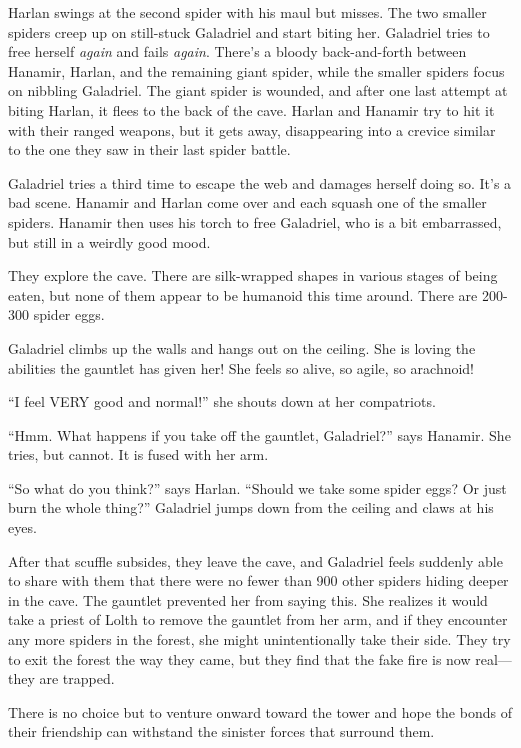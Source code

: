 \documentclass[smalldemyvopaper,11pt,twoside,onecolumn,openright,extrafontsizes]{memoir}
\begin{document}
Harlan swings at the second spider with his maul but misses. The two
smaller spiders creep up on still-stuck Galadriel and start biting her.
Galadriel tries to free herself \emph{again} and fails \emph{again}.
There's a bloody back-and-forth between Hanamir, Harlan, and the
remaining giant spider, while the smaller spiders focus on nibbling
Galadriel. The giant spider is wounded, and after one last attempt at
biting Harlan, it flees to the back of the cave. Harlan and Hanamir try
to hit it with their ranged weapons, but it gets away, disappearing into
a crevice similar to the one they saw in their last spider battle.

Galadriel tries a third time to escape the web and damages herself doing
so. It's a bad scene. Hanamir and Harlan come over and each squash one
of the smaller spiders. Hanamir then uses his torch to free Galadriel,
who is a bit embarrassed, but still in a weirdly good mood.

They explore the cave. There are silk-wrapped shapes in various stages
of being eaten, but none of them appear to be humanoid this time around.
There are 200-300 spider eggs.

Galadriel climbs up the walls and hangs out on the ceiling. She is
loving the abilities the gauntlet has given her! She feels so alive, so
agile, so arachnoid!

``I feel VERY good and normal!'' she shouts down at her compatriots.

``Hmm. What happens if you take off the gauntlet, Galadriel?'' says
Hanamir. She tries, but cannot. It is fused with her arm.

``So what do you think?'' says Harlan. ``Should we take some spider
eggs? Or just burn the whole thing?'' Galadriel jumps down from the
ceiling and claws at his eyes.

After that scuffle subsides, they leave the cave, and Galadriel feels
suddenly able to share with them that there were no fewer than 900 other
spiders hiding deeper in the cave. The gauntlet prevented her from
saying this. She realizes it would take a priest of Lolth to remove the
gauntlet from her arm, and if they encounter any more spiders in the
forest, she might unintentionally take their side. They try to exit the
forest the way they came, but they find that the fake fire is now
real---they are trapped.

There is no choice but to venture onward toward the tower and hope the
bonds of their friendship can withstand the sinister forces that
surround them.
\end{document}

